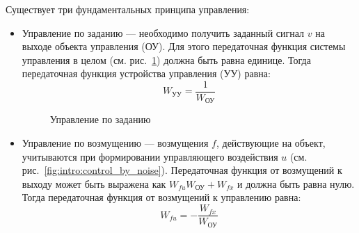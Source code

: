 \documentclass[preprint,russian,a5paper,10pt,twoside]{ncc}
\begin{document}
Существует три фундаментальных принципа управления:
\begin{itemize}
\item Управление по заданию --- необходимо получить заданный сигнал $v$ на выходе объекта управления (ОУ). Для этого передаточная функция системы управления в целом (см. рис.~\ref{fig:intro:control_by_target}) должна быть равна единице. Тогда передаточная функция устройства управления (УУ) равна:
\begin{equation}\label{equ:intro:control_by_target}
W_{\text{УУ}}=\frac{1}{W_{\text{ОУ}}}
\end{equation}

\begin{figure}[ht] \centering		%
\footnotesize \caption{Управление по заданию\label{fig:intro:control_by_target}}
\end{figure}

\item Управление по возмущению --- возмущения $f$, действующие на объект, учитываются при формировании управляющего воздействия $u$ (см. рис.~\ref{fig:intro:control_by_noise}). Передаточная функция от возмущений к выходу может быть выражена как $ W_{fu}W_\text{ОУ}+W_{fx} $ и должна быть равна нулю. Тогда передаточная функция от возмущений к управлению равна:
\begin{equation}\label{equ:intro:control_by_noise}
W_{fu}=-\frac{W_{fx}}{W_\text{ОУ}}
\end{equation}


\end{itemize}
\end{document}

